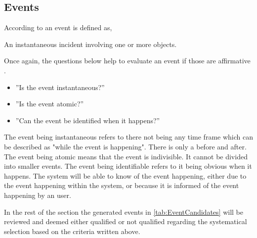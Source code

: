\subsection{Events} \label{sec:Events}
According to \citep[p.~53]{Rod-Aalborg} an event is defined as,
\begin{defn}\label{defn:Event}
An instantaneous incident involving one or more objects.
\end{defn}

Once again, the questions below help to evaluate an event if those are affirmative \citep[p.~65]{Rod-Aalborg}.
\begin{itemize}
	\item ''Is the event instantaneous?''
	\item ''Is the event atomic?''
	\item ''Can the event be identified when it happens?''
\end{itemize}

The event being instantaneous refers to there not being any time frame which can be described as "while the event is happening". 
There is only a before and after.
The event being atomic means that the event is indivisible. 
It cannot be divided into smaller events.
The event being identifiable refers to it being obvious when it happens. The system will be able to know of the event happening, either due to the event happening within the system, or because it is informed of the event happening by an user.

In the rest of the section the generated events in \cref{tab:EventCandidates} will be reviewed and deemed either qualified or not qualified regarding the systematical selection based on the criteria written above.

